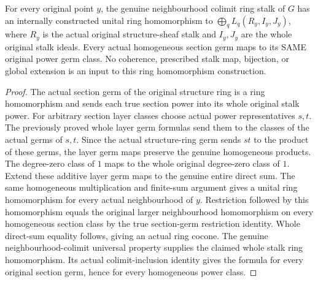 \begin{theorem}
\label{hir:real-domain-actual-normal-associated-ring-stalk-whole-map}
\leanok
For every original point $y$, the genuine neighbourhood colimit ring
stalk of $G$ has an internally constructed unital ring homomorphism to
$\bigoplus_q L_q(R_y,I_y,J_y)$, where $R_y$ is the actual original
structure-sheaf stalk and $I_y,J_y$ are the whole original stalk ideals.
Every actual homogeneous section germ maps to its SAME original power
germ class. No coherence, prescribed stalk map, bijection, or global
extension is an input to this ring homomorphism construction.
\end{theorem}
\begin{proof}
The actual section germ of the original structure ring is a ring
homomorphism and sends each true section power into its whole original
stalk power. For arbitrary section layer classes choose actual power
representatives $s,t$. The previously proved whole layer germ formulas
send them to the classes of the actual germs of $s,t$. Since the actual
structure-ring germ sends $st$ to the product of these germs, the layer
germ maps preserve the genuine homogeneous products. The degree-zero
class of $1$ maps to the whole original degree-zero class of $1$.
Extend these additive layer germ maps to the genuine entire direct sum.
The same homogeneous multiplication and finite-sum argument gives a
unital ring homomorphism for every actual neighbourhood of $y$.
Restriction followed by this homomorphism equals the original larger
neighbourhood homomorphism on every homogeneous section class by the
true section-germ restriction identity. Whole direct-sum equality
follows, giving an actual ring cocone. The genuine neighbourhood-colimit
universal property supplies the claimed whole stalk ring homomorphism.
Its actual colimit-inclusion identity gives the formula for every
original section germ, hence for every homogeneous power class.
\end{proof}
